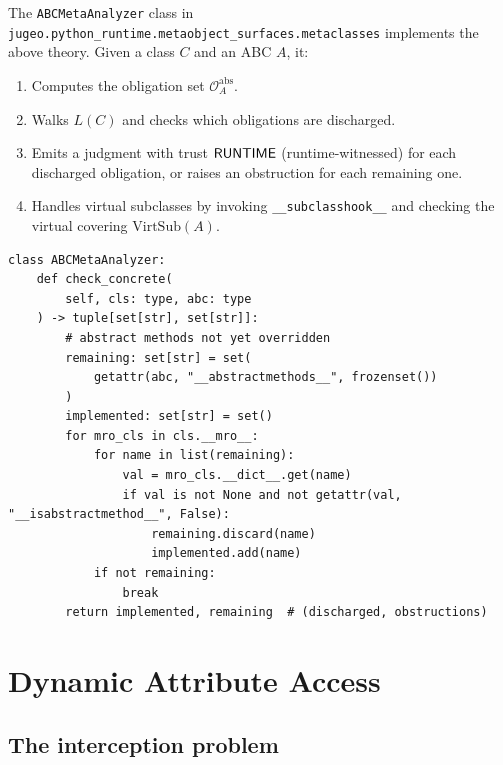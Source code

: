 \documentclass[11pt]{article}
\newcommand{\Clin}[1]{L(#1)}                     %
\newcommand{\AbstractObl}[1]{\mathcal{O}^{\mathrm{abs}}_{#1}}
\newcommand{\VirtSub}[1]{\mathrm{VirtSub}(#1)}
\newcommand{\subclasshook}{\texttt{\_\_subclasshook\_\_}}
\newcommand{\ABCAnalyzer}{\texttt{ABCMetaAnalyzer}}
\begin{document}
The \ABCAnalyzer{} class in
\texttt{jugeo.python\_runtime.metaobject\_surfaces.metaclasses} implements
the above theory.  Given a class $C$ and an ABC $A$, it:

\begin{enumerate}[leftmargin=1.5em]
  \item Computes the obligation set $\AbstractObl{A}$.
  \item Walks $\Clin{C}$ and checks which obligations are discharged.
  \item Emits a judgment with trust $\mathsf{RUNTIME}$ (runtime-witnessed)
    for each discharged obligation, or raises an obstruction for each
    remaining one.
  \item Handles virtual subclasses by invoking \subclasshook{} and
    checking the virtual covering $\VirtSub{A}$.
\end{enumerate}

\begin{lstlisting}[style=jugeo-python,
  caption={Sketch of \texttt{ABCMetaAnalyzer.check\_concrete}.
    The analyzer walks the MRO, collecting implemented methods;
    any remaining abstract methods become obstructions.},
  label=lst:abc-analyzer]
class ABCMetaAnalyzer:
    def check_concrete(
        self, cls: type, abc: type
    ) -> tuple[set[str], set[str]]:
        # abstract methods not yet overridden
        remaining: set[str] = set(
            getattr(abc, "__abstractmethods__", frozenset())
        )
        implemented: set[str] = set()
        for mro_cls in cls.__mro__:
            for name in list(remaining):
                val = mro_cls.__dict__.get(name)
                if val is not None and not getattr(val, "__isabstractmethod__", False):
                    remaining.discard(name)
                    implemented.add(name)
            if not remaining:
                break
        return implemented, remaining  # (discharged, obstructions)
\end{lstlisting}

\section{Dynamic Attribute Access}\label{sec:dynattr}

\subsection{The interception problem}
\end{document}

